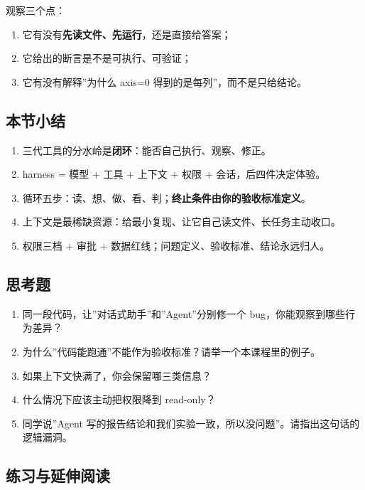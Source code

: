 观察三个点：

\begin{enumerate}
\def\labelenumi{\arabic{enumi}.}
\tightlist
\item
  它有没有\textbf{先读文件、先运行}，还是直接给答案；
\item
  它给出的断言是不是可执行、可验证；
\item
  它有没有解释''为什么 axis=0 得到的是每列''，而不是只给结论。
\end{enumerate}

\subsection{本节小结}\label{ux672cux8282ux5c0fux7ed3-3}

\begin{enumerate}
\def\labelenumi{\arabic{enumi}.}
\tightlist
\item
  三代工具的分水岭是\textbf{闭环}：能否自己执行、观察、修正。
\item
  harness = 模型 + 工具 + 上下文 + 权限 + 会话，后四件决定体验。
\item
  循环五步：读、想、做、看、判；\textbf{终止条件由你的验收标准定义}。
\item
  上下文是最稀缺资源：给最小复现、让它自己读文件、长任务主动收口。
\item
  权限三档 + 审批 + 数据红线；问题定义、验收标准、结论永远归人。
\end{enumerate}

\subsection{思考题}\label{ux601dux8003ux9898-27}

\begin{enumerate}
\def\labelenumi{\arabic{enumi}.}
\tightlist
\item
  同一段代码，让''对话式助手''和''Agent''分别修一个
  bug，你能观察到哪些行为差异？
\item
  为什么''代码能跑通''不能作为验收标准？请举一个本课程里的例子。
\item
  如果上下文快满了，你会保留哪三类信息？
\item
  什么情况下应该主动把权限降到 read-only？
\item
  同学说''Agent
  写的报告结论和我们实验一致，所以没问题''。请指出这句话的逻辑漏洞。
\end{enumerate}

\subsection{练习与延伸阅读}\label{ux7ec3ux4e60ux4e0eux5ef6ux4f38ux9605ux8bfb}

